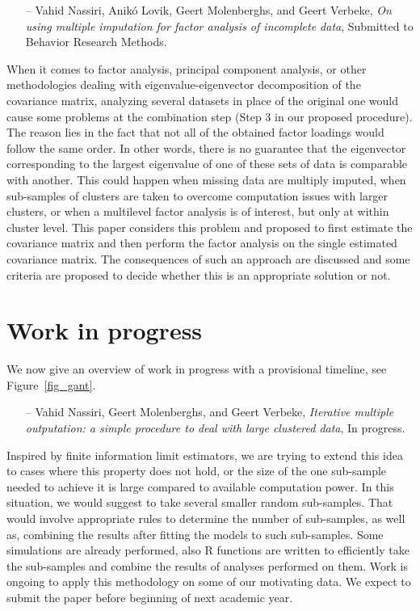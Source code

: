 \documentclass[14pt]{article}
\begin{document}
\begin{itemize}
\item[--]{\textsf{Vahid Nassiri, Anik\'{o} Lovik, Geert Molenberghs, and Geert Verbeke}}, {\it On using multiple imputation for factor analysis of incomplete data}, Submitted to Behavior Research Methods.
\end{itemize}
When it comes to factor analysis, principal component analysis, or other methodologies dealing with eigenvalue-eigenvector decomposition of the covariance matrix, analyzing several datasets in place of the original one would cause some problems at the combination step (Step 3 in our proposed procedure). The reason lies in the fact that not all of the obtained factor loadings would follow the same order. In other words, there is no guarantee that the eigenvector corresponding to the largest eigenvalue of one of these sets of data is comparable with another. This could happen when missing data are multiply imputed, when sub-samples of clusters are taken to overcome computation issues with larger clusters, or when a multilevel factor analysis is of interest, but only at within cluster level. This paper considers this problem and proposed to first estimate the covariance matrix and then perform the factor analysis on the single estimated covariance matrix. The consequences of such an approach are discussed and some criteria are proposed to decide whether this is an appropriate solution or not.



\section{Work in progress}
\label{sec_progress}

We now give an overview of work in progress with a provisional timeline, see Figure~\ref{fig_gant}.

\begin{itemize}
\item[--]{\textsf{Vahid Nassiri, Geert Molenberghs, and Geert Verbeke}}, {\it Iterative multiple outputation: a simple procedure to deal with large clustered data}, In progress.
\end{itemize}
Inspired by finite information limit estimators, we are trying to extend this idea to cases where this property does not hold, or the size of the one sub-sample needed to achieve it is large compared to available computation power. In this situation, we would suggest to take several smaller random sub-samples. That would involve appropriate rules to determine the number of sub-samples, as well as, combining the results after fitting the models to such sub-samples. Some simulations are already performed, also \textsf{R} functions are written to efficiently take the sub-samples and combine the results of analyses performed on them. Work is ongoing to apply this methodology on some of our motivating data. We expect to submit the paper before beginning of next academic year.
\end{document}

